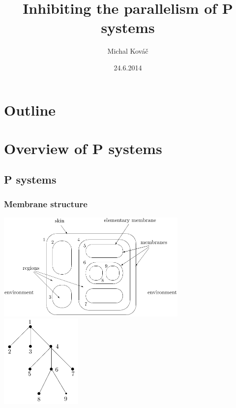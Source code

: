 \usepackage[utf8]{inputenc}
\usepackage{slovak}
\usepackage{tikz}
\usetikzlibrary{arrows,positioning}

\title{Inhibiting the parallelism of P systems}
\author{Michal Kováč}
\date{24.6.2014}


\begin{frame}[t]
\titlepage
\end{frame}
\note{}

\section*{Outline}
\begin{frame}
\tableofcontents
\end{frame}
\note{}

\section{Overview of P systems} %
\label{sec:overview_of_p_systems}

  \subsection{P systems} %
  \label{sub:p_systems}

    \begin{frame}[t]\frametitle{Membrane structure}
      \includegraphics[width=0.7\textwidth]{membrane_structure.png}
      \hfill
      \includegraphics[width=0.3\textwidth]{membrane_tree.png}

    \end{frame}
    \note{}

